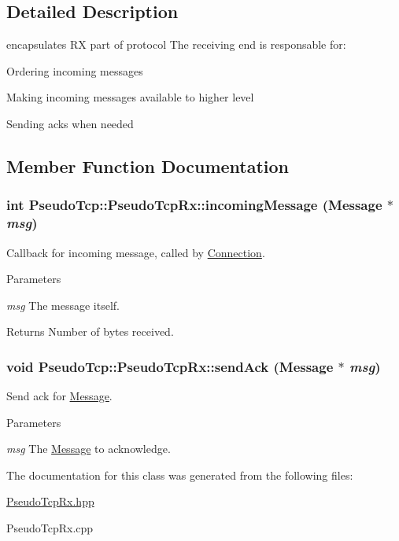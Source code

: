 \subsection{Detailed Description}
encapsulates RX part of protocol The receiving end is responsable for:
\begin{DoxyEnumerate}
\item Ordering incoming messages
\item Making incoming messages available to higher level
\item Sending acks when needed 
\end{DoxyEnumerate}

\subsection{Member Function Documentation}
\hypertarget{classPseudoTcp_1_1PseudoTcpRx_aa55a67cd15ae280201e8d0f0e669c7d1}{
\subsubsection[{incomingMessage}]{\setlength{\rightskip}{0pt plus 5cm}int PseudoTcp::PseudoTcpRx::incomingMessage ({\bf Message} $\ast$ {\em msg})}}
\label{classPseudoTcp_1_1PseudoTcpRx_aa55a67cd15ae280201e8d0f0e669c7d1}
Callback for incoming message, called by \hyperlink{classPseudoTcp_1_1Connection}{Connection}. 
\begin{DoxyParams}{Parameters}
\item[{\em msg}]The message itself. \end{DoxyParams}
\begin{DoxyReturn}{Returns}
Number of bytes received. 
\end{DoxyReturn}
\hypertarget{classPseudoTcp_1_1PseudoTcpRx_a1aa8f7e24cb9f2874f1a64a09ee05a50}{
\subsubsection[{sendAck}]{\setlength{\rightskip}{0pt plus 5cm}void PseudoTcp::PseudoTcpRx::sendAck ({\bf Message} $\ast$ {\em msg})}}
\label{classPseudoTcp_1_1PseudoTcpRx_a1aa8f7e24cb9f2874f1a64a09ee05a50}
Send ack for \hyperlink{classPseudoTcp_1_1Message}{Message}. 
\begin{DoxyParams}{Parameters}
\item[{\em msg}]The \hyperlink{classPseudoTcp_1_1Message}{Message} to acknowledge. \end{DoxyParams}


The documentation for this class was generated from the following files:\begin{DoxyCompactItemize}
\item 
\hyperlink{PseudoTcpRx_8hpp}{PseudoTcpRx.hpp}\item 
PseudoTcpRx.cpp\end{DoxyCompactItemize}

